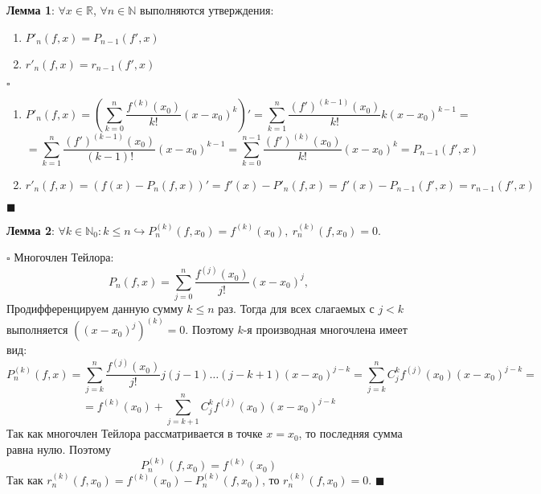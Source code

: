 \documentclass[12pt, a4paper, reqno]{article}
\begin{document}
    \textbf{Лемма 1}: $\forall x\in\mathbb{R}$, $\forall n \in\mathbb{N}$ выполняются утверждения:
    \begin{enumerate}
        \item $P'_n(f, x) = P_{n - 1}(f', x)$
        \item $r'_n(f, x) = r_{n - 1}(f', x)$
    \end{enumerate}

    $\square$
    \begin{enumerate}
        \item
        \begin{equation*}
            P'_n(f, x) = \left(\sum\limits_{k = 0}^{n}\dfrac{f^{(k)}(x_0)}{k!}(x - x_0)^k\right)' =
            \sum\limits_{k = 1}^{n}\dfrac{(f')^{(k - 1)}(x_0)}{k!}k(x - x_0)^{k - 1} =
        \end{equation*}
        \begin{equation*}
            = \sum\limits_{k = 1}^{n}\dfrac{(f')^{(k - 1)}(x_0)}{(k - 1)!}(x - x_0)^{k - 1} =
            \sum\limits_{k = 0}^{n - 1}\dfrac{(f')^{(k)}(x_0)}{k!}(x - x_0)^k =
            P_{n - 1}(f', x)
        \end{equation*}
        \item
        \begin{equation*}
            r'_n(f, x) = (f(x) - P_n(f, x))' = f'(x) - P'_n(f, x) =
            f'(x) - P_{n-1}(f', x) = r_{n - 1}(f', x)
        \end{equation*}
    \end{enumerate}
    $\blacksquare$

    \textbf{Лемма 2}: $\forall k\in\mathbb{N}_0: k \leq n\hookrightarrow P_{n}^{(k)}(f, x_0) =
    f^{(k)}(x_0),\ r_{n}^{(k)}(f, x_0) = 0$.

    $\square$ Многочлен Тейлора:
    \begin{equation*}
        P_n(f, x) = \sum\limits_{j = 0}^{n}\dfrac{f^{(j)}(x_0)}{j!}(x - x_0)^j,
    \end{equation*}
    Продифференцируем данную сумму $k \leq n$ раз. Тогда для всех слагаемых с $j < k$ выполняется
    $((x - x_0)^{j})^{(k)} = 0$. Поэтому $k$-я производная многочлена имеет вид:
    \begin{equation*}
        P_{n}^{(k)}(f, x) =
        \sum\limits_{j = k}^{n}\dfrac{f^{(j)}(x_0)}{j!}j(j - 1)\ldots(j - k + 1)(x - x_0)^{j - k} =
        \sum\limits_{j = k}^{n}C_{j}^{k}f^{(j)}(x_0)(x - x_0)^{j - k} =
    \end{equation*}
    \begin{equation*}
        = f^{(k)}(x_0) + \sum\limits_{j = k + 1}^{n}C_{j}^{k}f^{(j)}(x_0)(x - x_0)^{j - k}
    \end{equation*}
    Так как многочлен Тейлора рассматривается в точке $x = x_0$, то последняя сумма равна нулю.
    Поэтому
    \begin{equation*}
        P_{n}^{(k)}(f, x_0) = f^{(k)}(x_0)
    \end{equation*}
    Так как $r_{n}^{(k)}(f, x_0) = f^{(k)}(x_0) - P_{n}^{(k)}(f, x_0)$, то $r_{n}^{(k)}(f, x_0) = 0$.
    $\blacksquare$
\end{document}
